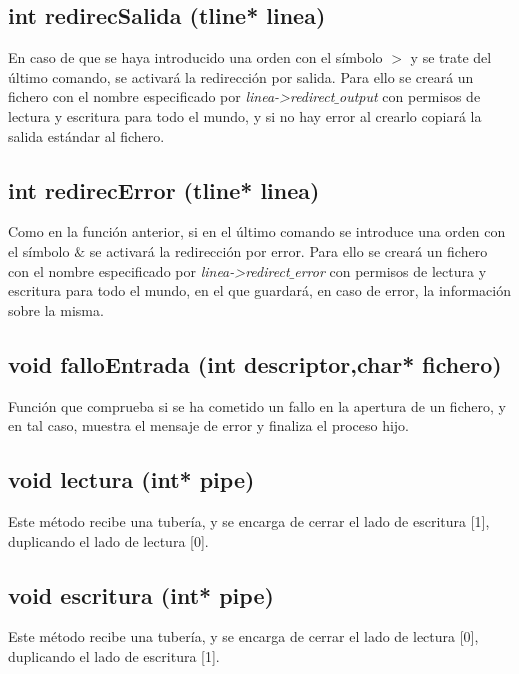 \subsection{int redirecSalida (tline* linea)}
En caso de que se haya introducido una orden con el símbolo $>$ y se trate del último comando, se activará la redirección por salida. Para ello se creará un fichero con el nombre especificado por \textit{linea->redirect$\_$output} con permisos de lectura y escritura para todo el mundo, y si no hay error al crearlo copiará la salida estándar al fichero.
\subsection{int redirecError (tline* linea)}
Como en la función anterior, si en el último comando se introduce una orden con el símbolo $\&$ se activará la redirección por error. Para ello se creará un fichero con el nombre especificado por \textit{linea->redirect$\_$error} con permisos de lectura y escritura para todo el mundo, en el que guardará, en caso de error, la información sobre la misma.
\subsection{void falloEntrada (int descriptor,char* fichero)}
Función que comprueba si se ha cometido un fallo en la apertura de un fichero, y en tal caso, muestra el mensaje de error y finaliza el proceso hijo.
\subsection{void lectura (int* pipe)}
Este método recibe una tubería, y se encarga de cerrar el lado de escritura [1], duplicando el lado de lectura [0].
\subsection{void escritura (int* pipe)}
Este método recibe una tubería, y se encarga de cerrar el lado de lectura [0], duplicando el lado de escritura [1].
\newpage
